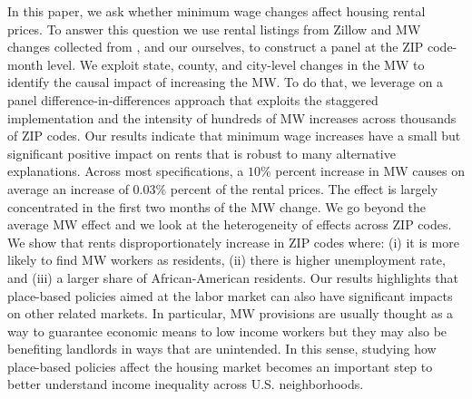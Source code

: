 
In this paper, we ask whether minimum wage changes affect housing rental prices. To answer this 
question we use rental listings from Zillow and MW changes collected from 
\textcite{VaghulZipperer2016}, \textcite{CegnizEtAl2019} and our ourselves, to construct a panel 
at the ZIP code-month level. We exploit state, county, and city-level changes in the MW to identify 
the causal impact of increasing the MW. To do that, we leverage on a panel difference-in-differences 
approach that exploits the staggered implementation and the intensity of hundreds of MW increases 
across thousands of ZIP codes. Our results indicate that minimum wage increases have a small but 
significant positive impact on rents that is robust to many alternative explanations. Across most 
specifications, a $10\%$ percent increase in MW causes on average an increase of $0.03 \%$ percent of 
the rental prices. The effect is largely concentrated in the first two months of the MW change. We go 
beyond the average MW effect and we look at the heterogeneity of effects across ZIP codes. We show 
that rents disproportionately increase in ZIP codes where: (i) it is more likely to find MW workers as 
residents, (ii) there is higher unemployment rate, and (iii) a larger share of African-American 
residents. Our results highlights that place-based policies aimed at the labor market can also have 
significant impacts on other related markets. In particular, MW provisions are usually thought as a 
way to guarantee economic means to low income workers but they may also be benefiting landlords in 
ways that are unintended. In this sense, studying how place-based policies affect the housing market 
becomes an important step to better understand income inequality across U.S. neighborhoods.

